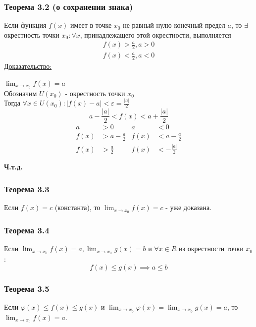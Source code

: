 \documentclass[12pt]{article}
\begin{document}
    \subsubsection*{Теорема 3.2 (о сохранении знака)}
    Если функция $f(x)$ имеет в точке $x_0$ не равный нулю конечный предел $a$, то $\exists$ окрестность точки $x_0 : \forall x$, принадлежащего этой окрестности, выполняется
    \begin{gather*}
        f(x) > \frac{a}{2}, a > 0\\
        f(x) < \frac{a}{2}, a < 0
    \end{gather*}
    \underline{Доказательство:}
    \begin{adjustwidth}{1.5em}{1.5em}
        $\lim_{x\to x_0}f(x) = a$\\
        Обозначим $U(x_0)$ - окрестность точки $x_0$\\
        Тогда $\forall x \in U(x_0) : |f(x) - a| < \varepsilon = \frac{|a|}{2}$
        \[a - \frac{|a|}{2} < f(x) < a + \frac{|a|}{2}\]
        \begin{align*}
            a &> 0 & a &< 0\\
            f(x) &> a - \frac{a}{2} & f(x) &< a - \frac{a}{2}\\
            f(x) &> \frac{a}{2} & f(x) &< -\frac{|a|}{2}
        \end{align*}
        \begin{center}
            \textbf{Ч.т.д.}
        \end{center}
    \end{adjustwidth}

    \subsubsection*{Теорема 3.3}
    Если $f(x) = c$ (константа), то $\lim_{x\to x_0}f(x) = c$ - уже доказана.
    
    \subsubsection*{Теорема 3.4}
    Если $\lim_{x\to x_0}f(x) = a, \lim_{x \to x_0}g(x) = b$ и $\forall x \in R$ из окрестности точки $x_0$:
    \[ f(x) \le g(x) \implies a \le b \]

    \subsubsection*{Теорема 3.5}
    Если $\varphi (x) \le f(x) \le g(x)$ и $\lim_{x\to x_0}\varphi(x) = \lim_{x\to x_0} g(x) = a$, то $\lim_{x\to x_0}f(x) = a$.
\end{document}
